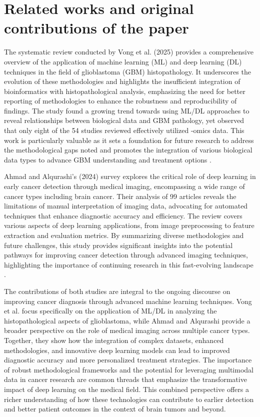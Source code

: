 \documentclass[runningheads]{llncs}
\begin{document}
\section{Related works and original contributions of the paper}
The systematic review conducted by Vong et al. (2025) provides a comprehensive overview of the application of machine learning (ML) and deep learning (DL) techniques in the field of glioblastoma (GBM) histopathology. It underscores the evolution of these methodologies and highlights the insufficient integration of bioinformatics with histopathological analysis, emphasizing the need for better reporting of methodologies to enhance the robustness and reproducibility of findings. The study found a growing trend towards using ML/DL approaches to reveal relationships between biological data and GBM pathology, yet observed that only eight of the 54 studies reviewed effectively utilized -omics data. This work is particularly valuable as it sets a foundation for future research to address the methodological gaps noted and promotes the integration of various biological data types to advance GBM understanding and treatment options \cite{Chun_2025}.

Ahmad and Alqurashi's (2024) survey explores the critical role of deep learning in early cancer detection through medical imaging, encompassing a wide range of cancer types including brain cancer. Their analysis of 99 articles reveals the limitations of manual interpretation of imaging data, advocating for automated techniques that enhance diagnostic accuracy and efficiency. The review covers various aspects of deep learning applications, from image preprocessing to feature extraction and evaluation metrics. By summarizing diverse methodologies and future challenges, this study provides significant insights into the potential pathways for improving cancer detection through advanced imaging techniques, highlighting the importance of continuing research in this fast-evolving landscape \cite{Istiak_2024}.

The contributions of both studies are integral to the ongoing discourse on improving cancer diagnosis through advanced machine learning techniques. Vong et al. focus specifically on the application of ML/DL in analyzing the histopathological aspects of glioblastoma, while Ahmad and Alqurashi provide a broader perspective on the role of medical imaging across multiple cancer types. Together, they show how the integration of complex datasets, enhanced methodologies, and innovative deep learning models can lead to improved diagnostic accuracy and more personalized treatment strategies. The importance of robust methodological frameworks and the potential for leveraging multimodal data in cancer research are common threads that emphasize the transformative impact of deep learning on the medical field. This combined perspective offers a richer understanding of how these technologies can contribute to earlier detection and better patient outcomes in the context of brain tumors and beyond.
\end{document}
